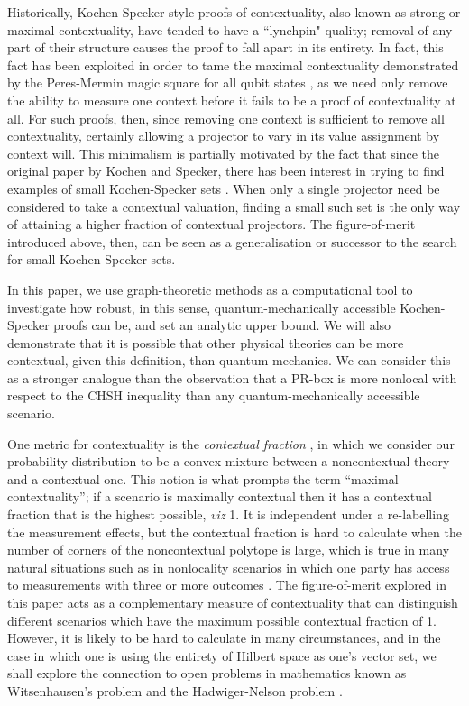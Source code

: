 \documentclass{article}
\theoremstyle{definition}
\begin{document}
Historically, Kochen-Specker style proofs of contextuality, also known as strong or maximal contextuality, have tended to have a ``lynchpin" quality; removal of any part of their structure causes the proof to fall apart in its entirety. In fact, this fact has been exploited in order to tame the maximal contextuality demonstrated by the Peres-Mermin magic square for all qubit states \cite{Berm2016}, as we need only remove the ability to measure one context before it fails to be a proof of contextuality at all. For such proofs, then, since removing one context is sufficient to remove all contextuality, certainly allowing a projector to vary in its value assignment by context will. This minimalism is partially motivated by the fact that since the original paper by Kochen and Specker, there has been interest in trying to find examples of small Kochen-Specker sets \cite{Aren2011}. When only a single projector need be considered to take a contextual valuation, finding a small such set is the only way of attaining a higher fraction of contextual projectors. The figure-of-merit introduced above, then, can be seen as a generalisation or successor to the search for small Kochen-Specker sets.

In this paper, we use graph-theoretic methods as a computational tool to investigate how robust, in this sense, quantum-mechanically accessible Kochen-Specker proofs can be, and set an analytic upper bound. We will also demonstrate that it is possible that other physical theories can be more contextual, given this definition, than quantum mechanics. We can consider this as a stronger analogue than the observation that a PR-box is more nonlocal with respect to the CHSH inequality than any quantum-mechanically accessible scenario.

One metric for contextuality is the \emph{contextual fraction} \cite{Abra2017}, in which we consider our probability distribution to be a convex mixture between a noncontextual theory and a contextual one. This notion is what prompts the term ``maximal contextuality''; if a scenario is maximally contextual then it has a contextual fraction that is the highest possible, \emph{viz} 1. It is independent under a  re-labelling the measurement effects, but the contextual fraction is hard to calculate when the number of corners of the noncontextual polytope is large, which is true in many natural situations such as in nonlocality scenarios in which one party has access to measurements with three or more outcomes \cite{SimmCC}. The figure-of-merit explored in this paper acts as a complementary measure of contextuality that can distinguish different scenarios which have the maximum possible contextual fraction of 1. However, it is likely to be hard to calculate in many circumstances, and in the case in which one is using the entirety of Hilbert space as one's vector set, we shall explore the connection to open problems in mathematics known as Witsenhausen's problem \cite{Wits1974} and the Hadwiger-Nelson problem \cite{Soif2008}.
\end{document}
